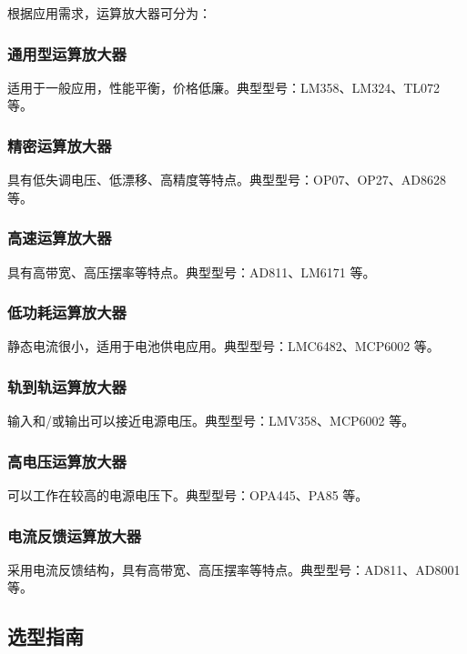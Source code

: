 根据应用需求，运算放大器可分为：

\subsubsection{通用型运算放大器}

适用于一般应用，性能平衡，价格低廉。典型型号：LM358、LM324、TL072 等。

\subsubsection{精密运算放大器}

具有低失调电压、低漂移、高精度等特点。典型型号：OP07、OP27、AD8628 等。

\subsubsection{高速运算放大器}

具有高带宽、高压摆率等特点。典型型号：AD811、LM6171 等。

\subsubsection{低功耗运算放大器}

静态电流很小，适用于电池供电应用。典型型号：LMC6482、MCP6002 等。

\subsubsection{轨到轨运算放大器}

输入和/或输出可以接近电源电压。典型型号：LMV358、MCP6002 等。

\subsubsection{高电压运算放大器}

可以工作在较高的电源电压下。典型型号：OPA445、PA85 等。

\subsubsection{电流反馈运算放大器}

采用电流反馈结构，具有高带宽、高压摆率等特点。典型型号：AD811、AD8001 等。

\subsection{选型指南}


